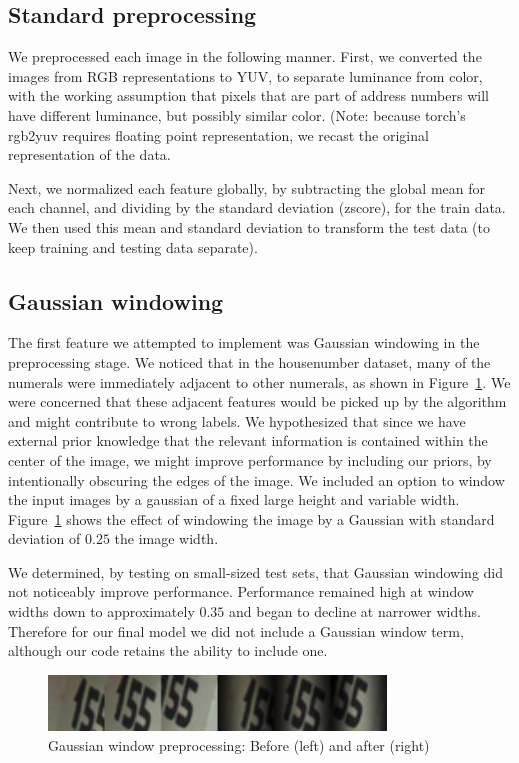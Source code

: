 \documentclass{article}
\begin{document}
\subsection{Standard preprocessing}
We preprocessed each image in the following manner. First, we converted the
images from RGB representations to YUV, to separate luminance from color, with
the working assumption that pixels that are part of address numbers will have
different luminance, but possibly similar color. (Note: because torch's rgb2yuv
requires floating point representation, we recast the original representation of the data.

Next, we normalized each feature globally, by subtracting the global mean for
each channel, and dividing by the standard deviation (zscore), for the train
data. We then used this mean and standard deviation to transform the test data
(to keep training and testing data separate).

\subsection{Gaussian windowing}
The first feature we attempted to implement was Gaussian windowing in the preprocessing stage. We noticed that in the housenumber dataset, many of the numerals were immediately adjacent to other numerals, as shown in Figure~\ref{fig1}. We were concerned that these adjacent features would be picked up by the algorithm and might contribute to wrong labels. We hypothesized that since we have external prior knowledge that the relevant information is contained within the center of the image, we might improve performance by including our priors, by intentionally obscuring the edges of the image. We included an option to window the input images by a gaussian of a fixed large height and variable width. Figure~\ref{fig1} shows the effect of windowing the image by a Gaussian with standard deviation of $0.25$ the image width. 

We determined, by testing on small-sized test sets, that Gaussian windowing did not noticeably improve performance. Performance remained high at window widths down to approximately $0.35$ and began to decline at narrower widths. Therefore for our final model we did not include a Gaussian window term, although our code retains the ability to include one.

\begin{figure}[h]
          \centering
          \includegraphics[width=0.8\textwidth]{housenumbers_win.png}
          \caption{Gaussian window preprocessing: Before (left) and after (right)}
          \label{fig1}
\end{figure}
\end{document}
